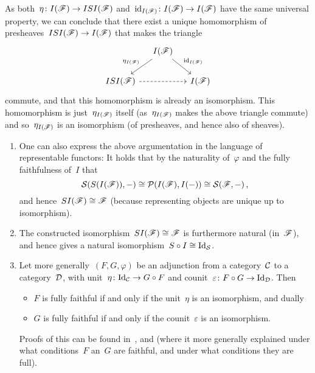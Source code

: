 \begin{example}
\begin{enumerate}
      As both~$\eta \colon I(\mathscr{F}) \to ISI(\mathscr{F})$ and~$\operatorname{id}_{I(\mathscr{F})} \colon I(\mathscr{F}) \to I(\mathscr{F})$ have the same universal property, we can conclude that there exist a unique homomorphism of presheaves~$ISI(\mathscr{F}) \to I(\mathscr{F})$ that makes the triangle
      \[
        \begin{tikzcd}[column sep = small]
            {}
          & I(\Fs)
            \arrow{dl}[above left]{\eta_{I(\Fs)}}
            \arrow{dr}[above right]{\id_{I(\Fs)}}
          & {}
          \\
            ISI(\Fs)
            \arrow[dashed]{rr}
          & {}
          & I(\Fs)
        \end{tikzcd}
      \]
      commute, and that this homomorphism is already an isomorphism.
      This homomorphism is just~$\eta_{I(\mathscr{F})}$ itself (as~$\eta_{I(\mathscr{F})}$ makes the above triangle commute) and so~$\eta_{I(\mathscr{F})}$ is an isomorphism (of presheaves, and hence also of sheaves).
      \begin{remark*}
        \leavevmode
        \begin{enumerate}
          \item
            One can also express the above argumentation in the language of representable functors:
            It holds that by the naturality of~$\varphi$ and the fully faithfulness of~$I$ that
            \[
                    \mathcal{S}(S(I(\mathscr{F})), -)
              \cong \mathcal{P}(I(\mathscr{F}), I(-))
              \cong \mathcal{S}(\mathscr{F}, -) \,,
            \]
            and hence~$SI(\mathscr{F}) \cong \mathscr{F}$ (because representing objects are unique up to isomorphism).
          \item
            The constructed isomorphism~$SI(\mathscr{F}) \cong \mathscr{F}$ is furthermore natural (in~$\mathscr{F}$), and hence gives a natural isomorphism~$S \circ I \cong \mathrm{Id}_{\mathcal{S}}$.
          \item
            Let more generally~$(F,G,\varphi)$ be an adjunction from a category~$\mathcal{C}$ to a category~$\mathcal{D}$, with unit~$\eta \colon \mathrm{Id}_{\mathcal{C}} \to G \circ F$ and counit~$\varepsilon \colon F \circ G \to \mathrm{Id}_{\mathcal{D}}$.
            Then
            \begin{itemize}
              \item
                $F$ is fully faithful if and only if the unit~$\eta$ is an isomorphism, and dually
              \item
                $G$ is fully faithful if and only if the counit~$\varepsilon$ is an isomorphism.
            \end{itemize}
            Proofs of this can be found in~\cite{stackfullyfaithful}, \cite[Lemma 7.6.6]{Brandenburg} and \cite[IV,~3,~Theorem~1]{Working} (where it more generally explained under what conditions~$F$ an~$G$ are faithful, and under what conditions they are full).
        \end{enumerate}
      \end{remark*}
      

\end{enumerate}
\end{example}
